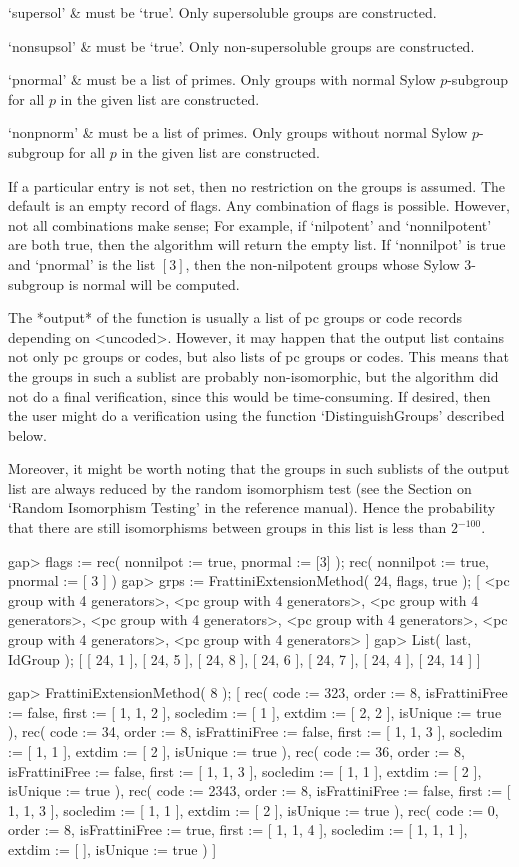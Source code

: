  `supersol' & 
      must be `true'. Only supersoluble groups are constructed.

 `nonsupsol' & 
      must be `true'. Only non-supersoluble groups are constructed.

 `pnormal' & 
      must be a list of primes. Only groups with normal Sylow $p$-subgroup
      for all $p$ in the given list are constructed.

 `nonpnorm' & 
      must be a list of primes. Only groups without normal Sylow $p$-subgroup
      for all $p$ in the given list are constructed.
\enditems

If a particular entry is not set, then no restriction on the 
groups is assumed. The default is an empty record of flags. Any
combination of flags is possible. However, not all combinations make
sense; For example, if `nilpotent' and `nonnilpotent' are both true, 
then the algorithm will return the empty list. If `nonnilpot' is
true and `pnormal' is the list $[3]$, then the non-nilpotent groups
whose Sylow 3-subgroup is normal will be computed.

The *output* of the function is usually a list of pc groups or code
records depending on <uncoded>. However, it may happen that the output
list contains not only pc groups or codes, but also lists of pc groups
or codes. This means that the groups in such a sublist are probably
non-isomorphic, but the algorithm did not do a final verification, since 
this would be time-consuming. If desired, then the user might do 
a verification using the function `DistinguishGroups' described
below.

Moreover, it might be worth noting that the groups in such sublists
of the output list are always reduced by the random isomorphism test
(see the Section on `Random Isomorphism Testing' in the reference manual).
Hence the probability that there are still isomorphisms between 
groups in this list is less than $2^{-100}$.

\beginexample
gap> flags := rec( nonnilpot := true, pnormal := [3] );
rec( nonnilpot := true, pnormal := [ 3 ] )
gap> grps := FrattiniExtensionMethod( 24, flags, true );
[ <pc group with 4 generators>, <pc group with 4 generators>, 
  <pc group with 4 generators>, <pc group with 4 generators>, 
  <pc group with 4 generators>, <pc group with 4 generators>, 
  <pc group with 4 generators> ]
gap> List( last, IdGroup );
[ [ 24, 1 ], [ 24, 5 ], [ 24, 8 ], [ 24, 6 ], [ 24, 7 ], [ 24, 4 ], 
  [ 24, 14 ] ]

gap> FrattiniExtensionMethod( 8 );
[ rec( code := 323, order := 8, isFrattiniFree := false, first := [ 1, 1, 2 ],
      socledim := [ 1 ], extdim := [ 2, 2 ], isUnique := true ), 
  rec( code := 34, order := 8, isFrattiniFree := false, first := [ 1, 1, 3 ], 
      socledim := [ 1, 1 ], extdim := [ 2 ], isUnique := true ), 
  rec( code := 36, order := 8, isFrattiniFree := false, first := [ 1, 1, 3 ], 
      socledim := [ 1, 1 ], extdim := [ 2 ], isUnique := true ), 
  rec( code := 2343, order := 8, isFrattiniFree := false, 
      first := [ 1, 1, 3 ], socledim := [ 1, 1 ], extdim := [ 2 ], 
      isUnique := true ), 
  rec( code := 0, order := 8, isFrattiniFree := true, first := [ 1, 1, 4 ], 
      socledim := [ 1, 1, 1 ], extdim := [  ], isUnique := true ) ]
\endexample

